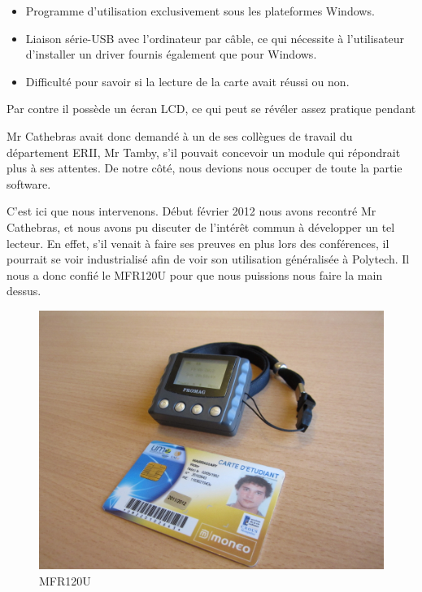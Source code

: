     \begin{itemize}
        \item Programme d'utilisation exclusivement sous les plateformes Windows.
        \item Liaison série-USB avec l'ordinateur par câble, ce qui nécessite 
              à l'utilisateur d'installer un driver fournis également que pour
              Windows.
        \item Difficulté pour savoir si la lecture de la carte avait réussi ou non.
    \end{itemize}

Par contre il possède un écran LCD, ce qui peut se révéler assez pratique pendant

Mr Cathebras avait donc demandé à un de ses collègues de travail du département
ERII, Mr Tamby, s'il pouvait concevoir un module qui répondrait plus à ses attentes.
De notre côté, nous devions nous occuper de toute la partie software.

C'est ici que nous intervenons. Début février 2012 nous avons recontré Mr Cathebras,
et nous avons pu discuter de l'intérêt commun à développer un tel lecteur. En effet,
s'il venait à faire ses preuves en plus lors des conférences, il pourrait se voir
industrialisé afin de voir son utilisation généralisée à Polytech. Il nous a donc
confié le MFR120U pour que nous puissions nous faire la main dessus.

    \begin{figure}[h]
        \begin{center}
            \includegraphics[scale=0.55]{images/mfr.jpg}
        \end{center}
        \caption{MFR120U}
        \label{MFR120U}
     \end{figure}  


